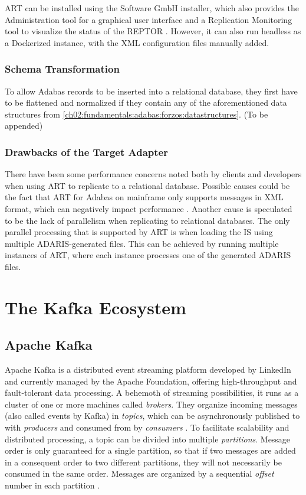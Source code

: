 \ac{ART} can be installed using the Software GmbH installer, which also provides the Administration tool for a graphical user interface and a Replication Monitoring tool to visualize the status of the \ac{REPTOR} \cite{artconcepts}. However, it can also run headless as a Dockerized instance, with the XML configuration files manually added.

\subsubsection{Schema Transformation}
To allow Adabas records to be inserted into a relational database, they first have to be flattened and normalized if they contain any of the aforementioned data structures from \ref{ch02:fundamentals:adabas:forzos:datastructures}. (To be appended)

\subsubsection{Drawbacks of the Target Adapter}
\label{ch02:fundamentals:adabas:art:limitations}
There have been some performance concerns noted both by clients and developers when using \ac{ART} to replicate to a relational database. Possible causes could be the fact that \ac{ART} for Adabas on mainframe only supports messages in XML format, which can negatively impact performance \cite{nicola2003xml}. Another cause is speculated to be the lack of parallelism when replicating to relational databases. The only parallel processing that is supported by \ac{ART} is when loading the \ac{IS} using multiple ADARIS-generated files. This can be achieved by running multiple instances of \ac{ART}, where each instance processes one of the generated ADARIS files.

\section{The Kafka Ecosystem}
\label{ch02:fundamentals:apachekafkaandkafkaconnect}

\subsection{Apache Kafka}
\label{ch02:fundamentals:apachekafkaandkafkaconnect:apachekafka}
Apache Kafka is a distributed event streaming platform developed by LinkedIn and currently managed by the Apache Foundation, offering high-throughput and fault-tolerant data processing. A behemoth of streaming possibilities, it runs as a cluster of one or more machines called \textit{brokers}. They organize incoming messages (also called events by Kafka) in \textit{topics}, which can be asynchronously published to with \textit{producers} and consumed from by \textit{consumers} \cite{peddireddystreamliningprocessingkafka}. To facilitate scalability and distributed processing, a topic can be divided into multiple \textit{partitions}. Message order is only guaranteed for a single partition, so that if two messages are added in a consequent order to two different partitions, they will not necessarily be consumed in the same order. Messages are organized by a sequential \textit{offset} number in each partition \cite{thein2014apache}.

